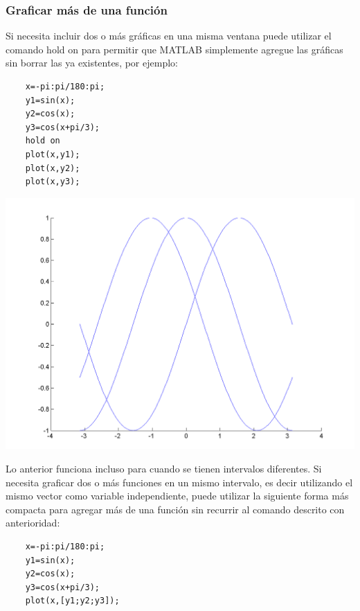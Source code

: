 \subsubsection{Graficar más de una función}

Si necesita incluir dos o más gráficas en una misma ventana puede utilizar el comando 
hold on para permitir que MATLAB simplemente agregue las gráficas sin borrar las ya 
existentes, por ejemplo:

\begin{verbatim}
	x=-pi:pi/180:pi;
	y1=sin(x);
	y2=cos(x);
	y3=cos(x+pi/3);
	hold on
	plot(x,y1);
	plot(x,y2);
	plot(x,y3);
\end{verbatim}

\begin{center}
\includegraphics[scale=0.6]{src/ch4/img_4_2.png}
\end{center}

Lo anterior funciona incluso para cuando se tienen intervalos diferentes. Si necesita 
graficar dos o más funciones en un mismo intervalo, es decir utilizando el mismo vector 
como variable independiente, puede utilizar la siguiente forma más compacta para agregar 
más de una función sin recurrir al comando descrito con anterioridad:

\begin{verbatim}
	x=-pi:pi/180:pi;
	y1=sin(x);
	y2=cos(x);
	y3=cos(x+pi/3);
	plot(x,[y1;y2;y3]);
\end{verbatim}

